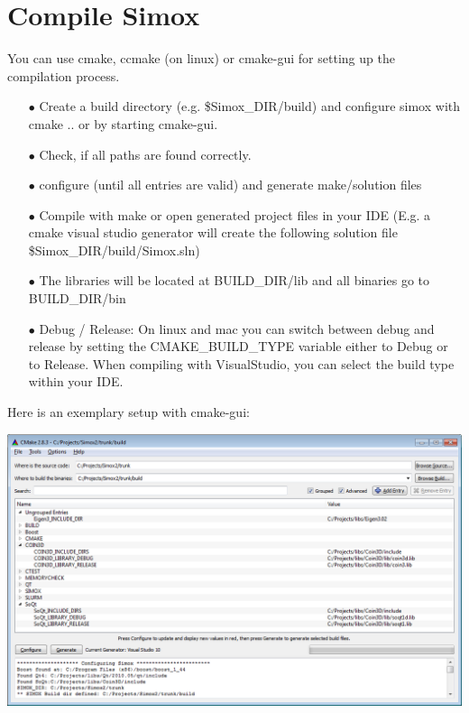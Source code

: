 \section{Compile Simox}
You can use cmake, ccmake (on linux) or cmake-gui for setting up the compilation process. 
\begin{itemize}

\item[$\bullet$]Create a build directory (e.g. \$Simox\_DIR/build) and configure simox with cmake .. or by starting cmake-gui.  
\item[$\bullet$]Check, if all paths are found correctly. 
\item[$\bullet$]configure (until all entries are valid) and generate make/solution files 
\item[$\bullet$]Compile with make or open generated project files in your IDE (E.g. a cmake visual studio generator will create the following solution file \$Simox\_DIR/build/Simox.sln)  
\item[$\bullet$]The libraries will be located at BUILD\_DIR/lib and all binaries go to BUILD\_DIR/bin 
\item[$\bullet$]Debug / Release: On linux and mac you can switch between debug and release by setting the CMAKE\_BUILD\_TYPE variable either to Debug or to Release. When compiling with VisualStudio, you can select the build type within your IDE.\par   
\end{itemize}
Here is an exemplary setup with cmake-gui:\par
\includegraphics[width=\textwidth]{Simox_cmake_gui}
